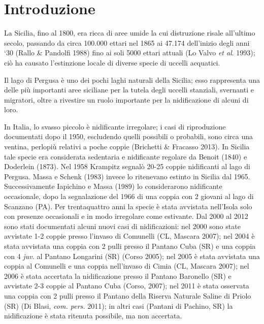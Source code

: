 \section*{Introduzione}
La Sicilia, fino al 1800, era ricca di aree umide la cui distruzione
risale all{\textquoteright}ultimo secolo, passando da circa 100.000
ettari nel 1865 ai 47.174 dell{\textquoteright}inizio degli anni
{\textquoteleft}30 (Rallo \& Pandolfi 1988) fino ai soli 5000 ettari
attuali (Lo Valvo \textit{et al}. 1993); ci\`o ha causato
l{\textquoteright}estinzione locale di diverse specie di uccelli
acquatici. 

Il lago di Pergusa \`e uno dei pochi laghi naturali della Sicilia; esso
rappresenta una delle pi\`u importanti aree siciliane per la tutela
degli uccelli stanziali, svernanti e migratori, oltre a
rivestire{ un ruolo importante per} la nidificazione
di alcuni di loro.

In Italia, lo svasso piccolo \`e nidificante irregolare; i casi di
riproduzione documentati dopo il 1950, escludendo quelli possibili o
probabili, sono circa una ventina, perlopi\`u relativi a poche coppie
(Brichetti \& Fracasso 2013). In Sicilia tale specie era considerata
sedentaria e nidificante regolare da Benoit (1840) e Doderlein (1873).
Nel 1958 Krampitz segnal\`o 20-25 coppie nidificanti al lago di
Pergusa. Massa e Schenk (1983) invece lo ritenevano estinto in Sicilia
dal 1965. Successivamente Iapichino e Massa (1989) lo considerarono
nidificante occasionale, dopo la segnalazione del 1966 di una coppia
con 2 giovani al lago di Scanzano (PA). {Per
trentaquattro anni la specie \`e stata} avvistata
nell{\textquoteright}Isola solo con presenze occasionali e in modo
irregolare come estivante. Dal 2000 al 2012 sono stati documentati
alcuni nuovi casi di nidificazioni: nel 2000 sono state avvistate 1-2
coppie presso l{\textquoteright}invaso di Comunelli (CL, Mascara
2007); nel 2004 \`e stata avvistata una coppia con 2 pulli
presso il Pantano Cuba (SR) e una coppia con 4 \textit{juv.} al Pantano
Longarini (SR) (Corso 2005); nel 2005 \`e stata avvistata una coppia al
Comunelli e una coppia nell{\textquoteright}invaso di Cimia (CL, Mascara 2007); nel 2006 \`e stata accertata la nidificazione presso il
Pantano Baronello (SR) e avvistate 2-3 coppie al Pantano Cuba (Corso,
2007); nel 2011 \`e stata osservata una coppia con 2 pulli
presso il Pantano della Riserva Naturale Saline di Priolo (SR) (Di
Blasi, \textit{com. pers. }2011); in altri casi (Pantani di Pachino,
SR) la nidificazione \`e stata ritenuta possibile, ma non accertata. 


